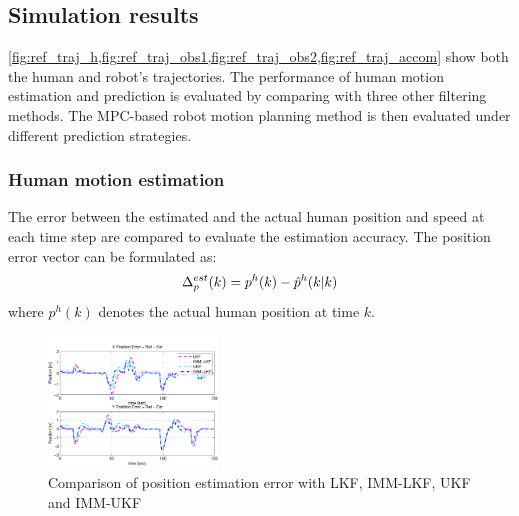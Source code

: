\documentclass[letterpaper, 10 pt, conference]{ieeeconf}
\begin{document}
	\subsection{Simulation results}
	\cref{fig:ref_traj_h,fig:ref_traj_obs1,fig:ref_traj_obs2,fig:ref_traj_accom} show both the human and robot's trajectories.	
	The performance of human motion estimation and prediction is evaluated by comparing with three other filtering methods. 
	The MPC-based robot motion planning method is then evaluated under different prediction strategies.
	\subsubsection{Human motion estimation}\label{subsubsec:motion_est}
	The error between the estimated and the actual human position and speed at each time step are compared to evaluate the estimation accuracy.
	The position error vector can be formulated as:
	\[
	\Delta^{est}_p(k)=p^h(k)-\hat{p}^h(k|k)\label{eqn:track_err_pos}\\
	\]
	where $p^h(k)$ denotes the actual human position at time $k$. 
	
	
	
	
	
	
	
	\begin{figure}
		\centering
		\includegraphics[width=0.4\textwidth]{figures/pos_error}
		\caption{Comparison of position estimation error with LKF, IMM-LKF, UKF and IMM-UKF}
		\label{fig:track_pos}
	\end{figure}
	
\end{document}
